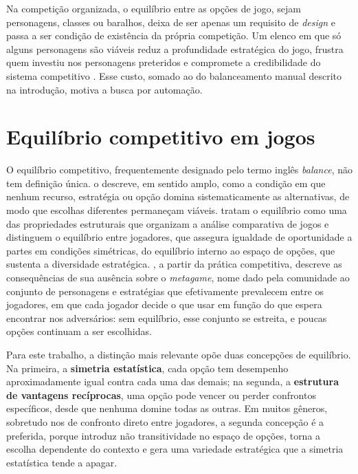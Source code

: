 Na competição organizada, o equilíbrio entre as opções de jogo, sejam personagens, classes ou baralhos, deixa de ser apenas um requisito de \textit{design} e passa a ser condição de existência da própria competição. Um elenco em que só alguns personagens são viáveis reduz a profundidade estratégica do jogo, frustra quem investiu nos personagens preteridos e compromete a credibilidade do sistema competitivo \cite{adams2014fundamentals}. Esse custo, somado ao do balanceamento manual descrito na introdução, motiva a busca por automação.

\section{Equilíbrio competitivo em jogos}
\label{sec: equilibrio}

O equilíbrio competitivo, frequentemente designado pelo termo inglês \textit{balance}, não tem definição única.  o descreve, em sentido amplo, como a condição em que nenhum recurso, estratégia ou opção domina sistematicamente as alternativas, de modo que escolhas diferentes permaneçam viáveis.  tratam o equilíbrio como uma das propriedades estruturais que organizam a análise comparativa de jogos e distinguem o equilíbrio entre jogadores, que assegura igualdade de oportunidade a partes em condições simétricas, do equilíbrio interno ao espaço de opções, que sustenta a diversidade estratégica. , a partir da prática competitiva, descreve as consequências de sua ausência sobre o \textit{metagame}, nome dado pela comunidade ao conjunto de personagens e estratégias que efetivamente prevalecem entre os jogadores, em que cada jogador decide o que usar em função do que espera encontrar nos adversários: sem equilíbrio, esse conjunto se estreita, e poucas opções continuam a ser escolhidas.

Para este trabalho, a distinção mais relevante opõe duas concepções de equilíbrio. Na primeira, a \textbf{simetria estatística}, cada opção tem desempenho aproximadamente igual contra cada uma das demais; na segunda, a \textbf{estrutura de vantagens recíprocas}, uma opção pode vencer ou perder confrontos específicos, desde que nenhuma domine todas as outras. Em muitos gêneros, sobretudo nos de confronto direto entre jogadores, a segunda concepção é a preferida, porque introduz não transitividade no espaço de opções, torna a escolha dependente do contexto e gera uma variedade estratégica que a simetria estatística tende a apagar.

